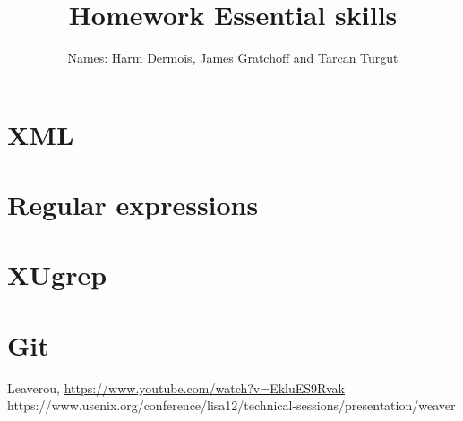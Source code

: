 \documentclass[12pt,a4paper]{article}
\begin{document}
\title{Homework Essential skills}
\author{Names: Harm Dermois, James Gratchoff and Tarcan Turgut }
\date{}
\maketitle

\section{XML}

\section{Regular expressions}

\section{XUgrep}

\section{Git}


\begin{thebibliography}{9}
	Leaverou,
	\url{https://www.youtube.com/watch?v=EkluES9Rvak}
	https://www.usenix.org/conference/lisa12/technical-sessions/presentation/weaver

\end{thebibliography}
\end{document}
